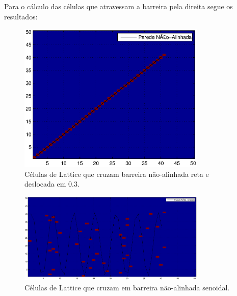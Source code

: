 Para o cálculo das células que atravessam a barreira pela direita segue os resultados:
\begin{figure}[h!]
    \centering
    \hspace{-1.5cm}
    \includegraphics[width=0.8\textwidth]{code/cruza_1.eps}
    \caption{Células de Lattice que cruzam barreira não-alinhada reta e deslocada em 0.3.}
\end{figure}
\begin{figure}[h!]
    \centering
    \hspace{-1.5cm}
    \includegraphics[width=0.8\textwidth]{code/cruza_2.eps}
    \caption{Células de Lattice que cruzam em barreira não-alinhada senoidal.}
\end{figure}
